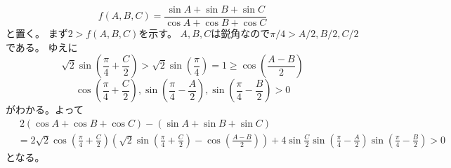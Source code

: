 \documentclass[uplatex, a5paper]{jsarticle}
\makeatletter
\theoremstyle{definition}
\renewenvironment{proof}[1][\proofname]{
  \pushQED{\qed}%
  \normalfont \topsep6\p@\@plus6\p@\relax
  \trivlist
  \item[\hskip\labelsep
    #1\@addpunct{\textbf{.}}]\ignorespaces
}{%
  \popQED\endtrivlist\@endpefalse
}
\providecommand{\proofname}{証明}
\def\qed{\hfill $\Box$}
\makeatother
\begin{document}
\begin{proof}
  \[
  f(A,B,C) = \frac{\sin A + \sin B + \sin C }{\cos A + \cos B + \cos C }
  \]
  と置く。
  まず\(2 > f(A,B,C) \)を示す。
  \(A,B,C\)は鋭角なので\(\pi /4 > A/2,B/2,C/2\)である。
  ゆえに
  \[
  \sqrt{2}\sin \left( \frac{\pi}{4} + \frac{C}{2} \right)
  > \sqrt{2}\sin \left( \frac{\pi}{4} \right)
  = 1 \geq \cos \left( \frac{A-B}{2} \right)
  \]
  \[
  \cos \left( \frac{\pi}{4} + \frac{C}{2} \right) ,
  \sin \left( \frac{\pi }{4} - \frac{A}{2} \right) ,
  \sin \left( \frac{\pi }{4} - \frac{B}{2} \right) > 0
  \]
  がわかる。よって
  \begin{align*}
    & \ 2\left( \cos A + \cos B + \cos C \right) - \left( \sin A + \sin B + \sin C \right) \\
    &= 2\sqrt{2} \cos \left( \frac{\pi}{4} + \frac{C}{2} \right)
    \left(\sqrt{2} \sin \left( \frac{\pi}{4} + \frac{C}{2} \right)
    - \cos \left( \frac{A-B}{2} \right) \right)
    + 4 \sin \frac{C}{2} \sin \left( \frac{\pi}{4} - \frac{A}{2} \right)
    \sin \left( \frac{\pi}{4} - \frac{B}{2} \right) > 0
  \end{align*}
  となる。


\end{proof}
\end{document}
